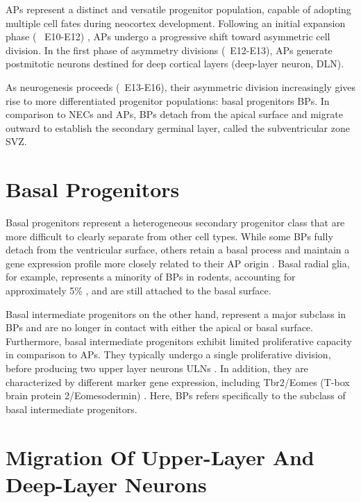 APs represent a distinct and versatile progenitor population, capable of adopting multiple cell fates during neocortex development. Following an initial expansion phase (~ E10-E12) , APs undergo a progressive shift toward asymmetric cell division. In the first phase of asymmetry divisions (~E12-E13), APs generate postmitotic neurons destined for deep cortical layers (deep-layer neuron, \gls{DLN}). 


As neurogenesis proceeds (~E13-E16), their asymmetric division increasingly gives rise to more differentiated progenitor populations: basal progenitors \glspl{BP}.
In comparison to NECs and APs, BPs detach from the apical surface and migrate outward to establish the secondary germinal layer, called the subventricular zone \gls{SVZ}.


\section{Basal Progenitors}

Basal progenitors represent a heterogeneous secondary progenitor class that are more difficult to clearly separate from other cell types. While some BPs fully detach from the ventricular surface, others retain a basal process and maintain a gene expression profile more closely related to their AP origin \citep{pilzAmplificationProgenitorsMammalian2013}. 
Basal radial glia, for example, represents a minority of BPs in rodents, accounting for approximately 5\% \citep{MARTINEZ-CERDENOComparativeAnalysisSubventricular2012}, and are still attached to the basal surface. 


Basal intermediate progenitors on the other hand, represent a major subclass in BPs and are no longer in contact with either the apical or basal surface. Furthermore, basal intermediate progenitors exhibit limited proliferative capacity in comparison to APs. They typically undergo a single proliferative division, before producing two upper layer neurons \glspl{ULN} \citep{THORIndirectNeurogenesisSpace2024}. 
In addition, they are characterized by different marker gene expression, including Tbr2/Eomes (T-box brain protein 2/Eomesodermin) \citep{ENGLUNDPax6Tbr2Tbr12005}. Here, BPs refers specifically to the subclass of basal intermediate progenitors. 

\section{Migration Of Upper-Layer And Deep-Layer Neurons}

